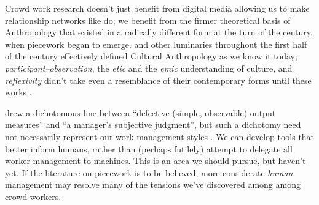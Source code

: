 \documentclass[trackingWork]{subfiles}
\begin{document}
\subsubsubsection{\implication}
Crowd work research doesn't just benefit from
digital media allowing us to make
relationship networks like \citeauthor{crowdcollab} do;
we benefit from the firmer theoretical basis of Anthropology that
existed in a radically different form at the turn of the  century,
when piecework began to emerge.
\citeauthor{malinowski2002argonauts,boas1940race,mead1973coming} and
other luminaries throughout the first half of the  century
effectively defined Cultural Anthropology as we know it today;
\textit{participant--observation},
the \textit{etic} and the \textit{emic} understanding of culture, and
\textit{reflexivity}
didn't take even a resemblance of their contemporary forms until these works
\cite{malinowski2002argonauts,boas1940race,mead1973coming}.

\citeauthor{10.2307/2555446} drew a dichotomous line between
``defective (simple, observable) output measures'' and
``a manager's subjective judgment'',
but such a dichotomy need not necessarily represent our work management styles
\cite{10.2307/2555446}.
We can develop tools that better inform humans, rather than
(perhaps futilely) attempt to delegate all worker management to machines.
This is an area we should pursue, but haven't yet.
If the literature on piecework is to be believed,
more considerate \textit{human} management may resolve
many of the tensions we've discovered among among crowd workers.







\end{document}
